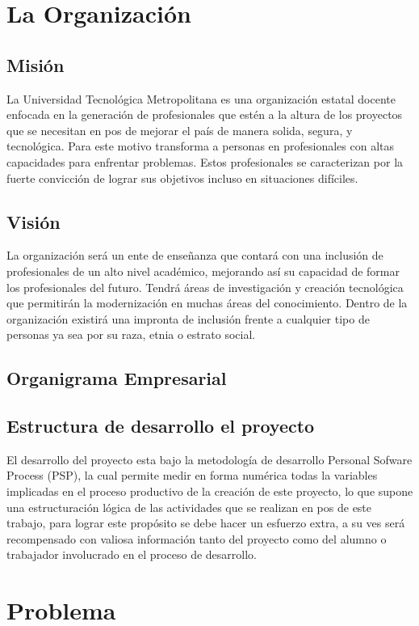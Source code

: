 \documentclass[a4paper,12pt,openany,oneside]{book}
\begin{document}
\chapter{La Organización}
\thispagestyle{empty}
\section{Misión}
La Universidad Tecnológica Metropolitana es una organización estatal docente enfocada en la generación de profesionales que estén a la altura de los proyectos que se necesitan en pos de mejorar el país de manera solida, segura, y tecnológica. Para este motivo transforma a personas en profesionales con altas capacidades para enfrentar problemas. Estos profesionales se caracterizan por la fuerte convicción de lograr sus objetivos incluso en situaciones difíciles.
\section{Visión}
La organización será un ente de enseñanza que contará con una inclusión de profesionales de un alto nivel académico, mejorando así su capacidad de formar los profesionales del futuro. Tendrá áreas de investigación y creación tecnológica que permitirán la modernización en muchas áreas del conocimiento. Dentro de la organización existirá una impronta de inclusión frente a cualquier tipo de personas ya sea por su raza, etnia o estrato social. 
\section{Organigrama Empresarial}

\section{Estructura de desarrollo el proyecto}
El desarrollo del proyecto esta bajo la metodología de desarrollo Personal Sofware Process (PSP), la cual permite medir en forma numérica todas la variables implicadas en el proceso productivo de la creación de este proyecto, lo que supone una estructuración lógica de las actividades que se realizan en pos de este trabajo, para lograr este propósito se debe hacer un esfuerzo extra, a su ves será recompensado con valiosa información tanto del proyecto como del alumno o trabajador involucrado en el proceso de desarrollo.
\chapter{Problema}
\thispagestyle{empty}
\end{document}
